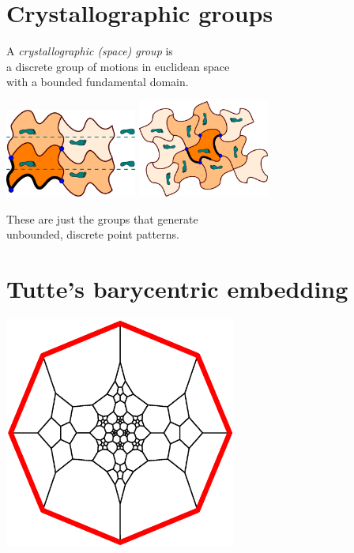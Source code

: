 \documentclass{beamer}
\begin{document}
\section{Crystallographic groups}

\begin{frame}
  \begin{center}
    A {\em crystallographic (space) group\/} is\\
    a discrete group of motions in euclidean space\\
    with a bounded fundamental domain.

    \includegraphics[width=1.7in]{heesch-TGTG}
    \qquad
    \includegraphics[width=1.7in]{heesch-C4C4C4C4C}

    These are just the groups that generate\\
    unbounded, discrete point patterns.
  \end{center}
\end{frame}


\section{Tutte's barycentric embedding}

\begin{frame}
  \begin{center}
    \includegraphics[width=3in]{schlegel2}
  \end{center}
\end{frame}
\end{document}
